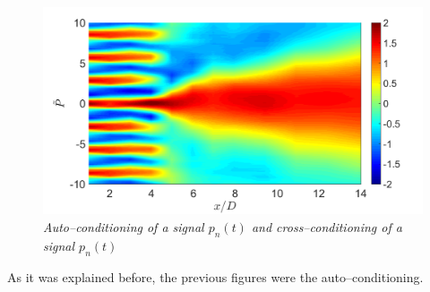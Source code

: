 \begin{figure}
	\centering
	\includegraphics[width=1\textwidth]{Figures/conditioning/autoCondSt0p35.png}
	\caption{\textit{Auto--conditioning of a signal $p_n(t)$ and cross--conditioning of a signal $p_n(t)$}}
	\label{fig:autoCondSt0p35}
\end{figure}
As it was explained before, the previous figures were the auto--conditioning. 
